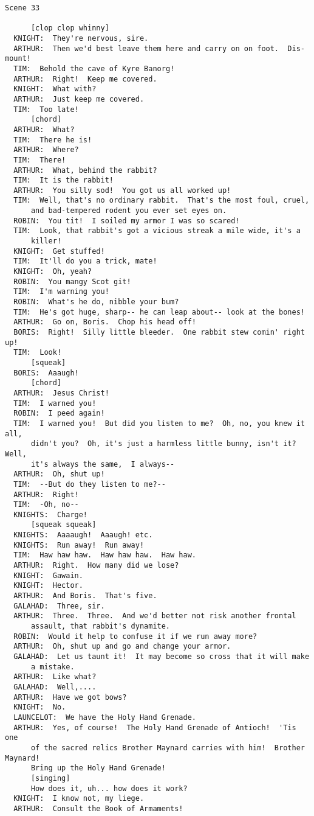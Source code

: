 \documentclass{article}
\begin{document}
\begin{verbatim}
Scene 33

      [clop clop whinny]
  KNIGHT:  They're nervous, sire.
  ARTHUR:  Then we'd best leave them here and carry on on foot.  Dis-mount!
  TIM:  Behold the cave of Kyre Banorg!
  ARTHUR:  Right!  Keep me covered.
  KNIGHT:  What with?
  ARTHUR:  Just keep me covered.
  TIM:  Too late!
      [chord]
  ARTHUR:  What?
  TIM:  There he is!
  ARTHUR:  Where?
  TIM:  There!
  ARTHUR:  What, behind the rabbit?
  TIM:  It is the rabbit!
  ARTHUR:  You silly sod!  You got us all worked up!
  TIM:  Well, that's no ordinary rabbit.  That's the most foul, cruel,
      and bad-tempered rodent you ever set eyes on.
  ROBIN:  You tit!  I soiled my armor I was so scared!
  TIM:  Look, that rabbit's got a vicious streak a mile wide, it's a
      killer!
  KNIGHT:  Get stuffed!
  TIM:  It'll do you a trick, mate!
  KNIGHT:  Oh, yeah?
  ROBIN:  You mangy Scot git!
  TIM:  I'm warning you!
  ROBIN:  What's he do, nibble your bum?
  TIM:  He's got huge, sharp-- he can leap about-- look at the bones!
  ARTHUR:  Go on, Boris.  Chop his head off!
  BORIS:  Right!  Silly little bleeder.  One rabbit stew comin' right up!
  TIM:  Look!
      [squeak]
  BORIS:  Aaaugh!
      [chord]
  ARTHUR:  Jesus Christ!
  TIM:  I warned you!
  ROBIN:  I peed again!
  TIM:  I warned you!  But did you listen to me?  Oh, no, you knew it all,
      didn't you?  Oh, it's just a harmless little bunny, isn't it?  Well,
      it's always the same,  I always--
  ARTHUR:  Oh, shut up!
  TIM:  --But do they listen to me?--
  ARTHUR:  Right!
  TIM:  -Oh, no--
  KNIGHTS:  Charge!
      [squeak squeak]
  KNIGHTS:  Aaaaugh!  Aaaugh! etc.
  KNIGHTS:  Run away!  Run away!
  TIM:  Haw haw haw.  Haw haw haw.  Haw haw.
  ARTHUR:  Right.  How many did we lose?
  KNIGHT:  Gawain.
  KNIGHT:  Hector.
  ARTHUR:  And Boris.  That's five.
  GALAHAD:  Three, sir.
  ARTHUR:  Three.  Three.  And we'd better not risk another frontal
      assault, that rabbit's dynamite.
  ROBIN:  Would it help to confuse it if we run away more?
  ARTHUR:  Oh, shut up and go and change your armor.
  GALAHAD:  Let us taunt it!  It may become so cross that it will make
      a mistake.
  ARTHUR:  Like what?
  GALAHAD:  Well,....
  ARTHUR:  Have we got bows?
  KNIGHT:  No.
  LAUNCELOT:  We have the Holy Hand Grenade.
  ARTHUR:  Yes, of course!  The Holy Hand Grenade of Antioch!  'Tis one
      of the sacred relics Brother Maynard carries with him!  Brother Maynard!
      Bring up the Holy Hand Grenade!
      [singing]
      How does it, uh... how does it work?
  KNIGHT:  I know not, my liege.
  ARTHUR:  Consult the Book of Armaments!

\end{verbatim}
\end{document}
